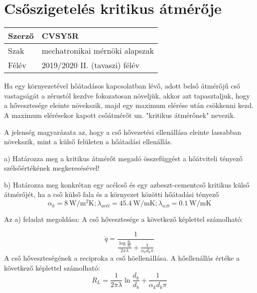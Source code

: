 
\section*{Csőszigetelés kritikus átmérője}


\begin{tabular}{ | p{2cm} | p{14cm} | } 
	\hline
	Szerző & CVSY5R \\ 
	\hline
	Szak & mechatronikai mérnöki alapszak \\ 
	\hline
	Félév & 2019/2020 II. (tavaszi) félév \\ 
	\hline
\end{tabular}
\vspace{0.5cm}

\noindent Ha egy környezetével hőátadásos kapcsolatban lévő, adott belső átmérőjű cső vastagságát a zérustól kezdve fokozatosan növeljük, akkor azt tapasztaljuk, hogy a hővesztesége eleinte növekszik, majd egy maximum elérése után csökkenni kezd. A maximum elérésekor kapott csőátmérőt un. "kritikus átmérőnek" nevezik.

A jelenség magyarázata az, hogy a cső hővezetési ellenállása eleinte lassabban növekszik, mint a külső felületen a hőátadási ellenállás.

a) Határozza meg a kritikus átmérőt megadó összefüggést a hőátviteli tényező szélsőértékének megkeresésével!

b) Határozza meg konkrétan egy acélcső és egy azbeszt-cementcső kritikus külső átmérőjét, ha a cső külső fala és a környezet közötti hőátadási tényező 
\[\alpha_k = \SI{8}{\watt\per\meter\squared\kelvin}; \lambda_{\textit{acél}} = \SI{45,4}{\watt\per\meter\kelvin}; \lambda_{azb} = \SI{0,1}{\watt\per\meter\kelvin}\]

Az a) feladat megoldása:
A cső hővesztesége a következő képlettel számolható: 

\begin{equation}
	\dot{q} = \frac{1}{\frac{\log{\frac{d_k}{d_b}}}{2 \pi \lambda}+\frac{1}{\alpha_k d_k \pi}}
\end{equation}
A cső hőveszteségének a reciproka a cső höellenállása. A hőellenállás értéke a következő képlettel számolható:
\begin{equation}
	R_L = \frac{1}{2 \pi \lambda}\ln{\frac{d_k}{d_b}}+\frac{1}{\alpha_k d_k \pi} 
\end{equation}


